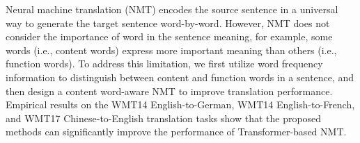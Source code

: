 Neural machine translation (NMT) encodes the source sentence in a universal way to generate the target sentence word-by-word. However, NMT does not consider the importance of word in the sentence meaning, for example, some words (i.e., content words) express more important meaning than others (i.e., function words). To address this limitation, we first utilize word frequency information to distinguish between content and function words in a sentence, and then design a content word-aware NMT to improve translation performance. Empirical results on the WMT14 English-to-German, WMT14 English-to-French, and WMT17 Chinese-to-English translation tasks show that the proposed methods can significantly improve the performance of Transformer-based NMT.
